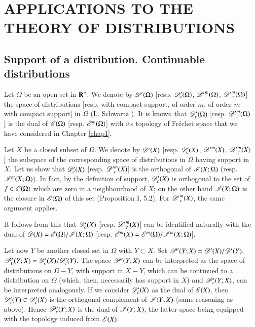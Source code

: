 \chapter{APPLICATIONS TO THE THEORY OF DISTRIBUTIONS}\label{chap7}

\section{Support of a distribution. Continuable distributions}\label{chap7-sec1}

Let $\Omega$ be an open set in $\mathbf{R}^{n}$. We denote by $\mathscr{D}'(\Omega)$ [resp. $\mathscr{D}'_{c}(\Omega)$, ${\mathscr{D}'}^{m}(\Omega)$, ${\mathscr{D}'}^{m}_{c}(\Omega)$] the space of distributions [resp. with compact support, of order $m$, of order $m$ with compact support] in $\Omega$ (L. Schwartz \cite{L. Schwartz : 1}). It is known that $\mathscr{D}'_{c}(\Omega)$ [resp. ${\mathscr{D}'}^{m}_{c}(\Omega)$] is the dual of $\mathscr{E}(\Omega)$ [resp. $\mathscr{E}^{m}(\Omega)$] with its topology of Fr\'echet space that we have considered in Chapter \ref{chap1}.

Let $X$ be a closed subset of $\Omega$. We denote by $\mathscr{D}'(X)$ [resp. $\mathscr{D}'_{c}(X)$, ${\mathscr{D}'}^{m}(X)$, ${\mathscr{D}'}^{m}_{c}(X)$] the subspace of the corresponding space of distributions in $\Omega$ having support in $X$. Let us show that $\mathscr{D}'_{c}(X)$ [resp. ${\mathscr{D}'}^{m}_{c}(X)$] is the orthogonal of $\mathscr{I}(X;\Omega)$ (resp. $\mathscr{I}^{m}(X;\Omega)$). In fact, by the definition of support, $\mathscr{D}'_{c}(X)$ is orthogonal to the set of $f\in \mathscr{E}(\Omega)$ which are zero in a neighbourhood of $X$; on the other hand $\mathscr{I}(X;\Omega)$ is the closure in $\mathscr{E}(\Omega)$ of this set (Proposition I, 5.2). For ${\mathscr{D}'}^{m}_{c}(X)$, the same argument applies.

It follows from this that $\mathscr{D}'_{c}(X)$ [resp. ${\mathscr{D}'}^{m}_{c}(X)$] can be identified naturally with the dual of $\mathscr{D}(X)=\mathscr{E}(\Omega)/\mathscr{I}(X;\Omega)$ [resp. $\mathscr{E}^{m}(X)=\mathscr{E}^{m}(\Omega)/\mathscr{I}^{m}(X;\Omega)$].

Let now $Y$ be another closed set in $\Omega$ with $Y\subset X$. Set $\mathscr{P}'(Y;X)=\mathscr{D}'(X)/\mathscr{D}'(Y)$, $\mathscr{P}'_{0}(Y;X)=\mathscr{D}'_{c}(X)/\mathscr{D}'_{c}(Y)$. The space $\mathscr{P}'(Y;X)$ can be interpreted as the space of distributions on $\Omega-Y$, with support in $X-Y$, which can be continued to a distribution on $\Omega$ (which, then, necessarily has support in $X$) and $\mathscr{P}'_{c}(Y;X)$, can be interpreted analogously. If we consider $\mathscr{D}'_{c}(X)$ as the dual of $\mathscr{E}(X)$, then $\mathscr{D}'_{c}(Y)\subset \mathscr{D}'_{c}(X)$ is the orthogonal complement of $\mathscr{I}(Y;X)$ (same reasoning as above). Hence $\mathscr{P}'_{c}(Y;X)$ is the dual of $\mathscr{I}(Y;X)$, the latter space being equipped with the topology induced from $\mathscr{E}(X)$.

